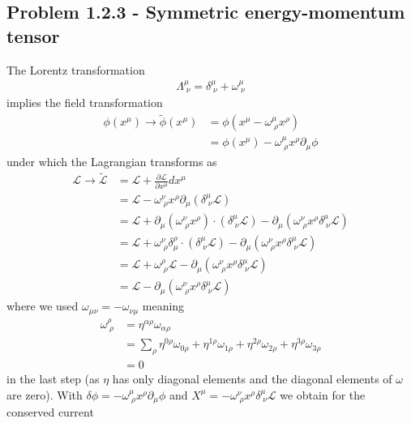 \documentclass[10pt,a4paper]{book}
\theoremstyle{definition}
\begin{document}
\subsection{Problem 1.2.3 - Symmetric energy-momentum tensor}
The Lorentz transformation
\begin{align}
    \Lambda^\mu_{\;\nu}=\delta^\mu_{\;\nu}+\omega^\mu_{\;\nu}
\end{align}
implies the field transformation
\begin{align}
    \phi(x^\mu)\rightarrow\tilde\phi(x^\mu)&=\phi(x^\mu-\omega^\mu_{\;\rho}x^\rho)\\
    &=\phi(x^\mu)-\omega^\mu_{\;\rho}x^\rho\partial_\mu\phi
\end{align}
under which the Lagrangian transforms as
\begin{align}
    \mathcal{L}\rightarrow\tilde{\mathcal{L}}&=\mathcal{L}+\frac{\partial\mathcal{L}}{\partial x^\mu}dx^\mu\\
    &=\mathcal{L}-\omega^\nu_{\;\rho}x^\rho\partial_\mu(\delta^\mu_{\;\nu}\mathcal{L})\\
    &=\mathcal{L}+\partial_\mu(\omega^\nu_{\;\rho}x^\rho)\cdot(\delta^\mu_{\;\nu}\mathcal{L})-\partial_\mu(\omega^\nu_{\;\rho}x^\rho\delta^\mu_{\;\nu}\mathcal{L})\\
    &=\mathcal{L}+\omega^\nu_{\;\rho}\delta^\rho_\mu\cdot(\delta^\mu_{\;\nu}\mathcal{L})-\partial_\mu(\omega^\nu_{\;\rho}x^\rho\delta^\mu_{\;\nu}\mathcal{L})\\
    &=\mathcal{L}+\omega^\rho_{\;\rho}\mathcal{L}-\partial_\mu(\omega^\nu_{\;\rho}x^\rho\delta^\mu_{\;\nu}\mathcal{L})\\
    &=\mathcal{L}-\partial_\mu(\omega^\nu_{\;\rho}x^\rho\delta^\mu_{\;\nu}\mathcal{L})
\end{align}
where we used $\omega_{\mu\nu}=-\omega_{\nu\mu}$ meaning
\begin{align}
    \omega^\rho_{\;\rho}&=\eta^{\alpha\rho}\omega_{\alpha\rho}\\
    &=\sum_\rho\eta^{0\rho}\omega_{0\rho}+\eta^{1\rho}\omega_{1\rho}+\eta^{2\rho}\omega_{2\rho}+\eta^{3\rho}\omega_{3\rho}\\
    &=0
\end{align}    
in the last step (as $\eta$ has only diagonal elements and the diagonal elements of $\omega$ are zero). With $\delta\phi=-\omega^\mu_{\;\rho}x^\rho\partial_\mu\phi$ and $X^\mu=-\omega^\nu_{\;\rho}x^\rho\delta^\mu_{\;\nu}\mathcal{L}$ we obtain for the conserved current  
\end{document}
